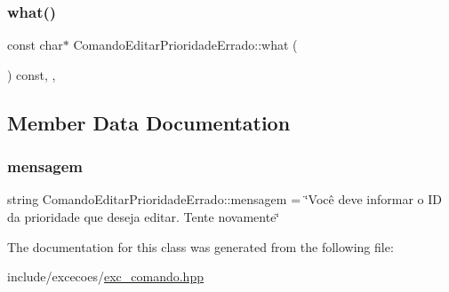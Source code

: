 \subsubsection{\texorpdfstring{what()}{what()}}
{\footnotesize\ttfamily const char$\ast$ Comando\+Editar\+Prioridade\+Errado\+::what (\begin{DoxyParamCaption}{ }\end{DoxyParamCaption}) const\hspace{0.3cm}{\ttfamily [inline]}, {\ttfamily [override]}, {\ttfamily [noexcept]}}



\subsection{Member Data Documentation}
\mbox{\label{classComandoEditarPrioridadeErrado_a262cdc745b1bfc1d621b657a3c7c39ed}} 
\subsubsection{\texorpdfstring{mensagem}{mensagem}}
{\footnotesize\ttfamily string Comando\+Editar\+Prioridade\+Errado\+::mensagem = \char`\"{}Você deve informar o ID da prioridade que deseja editar. Tente novamente\char`\"{}\hspace{0.3cm}{\ttfamily [private]}}



The documentation for this class was generated from the following file\+:\begin{DoxyCompactItemize}
\item 
include/excecoes/\hyperlink{exc__comando_8hpp}{exc\+\_\+comando.\+hpp}\end{DoxyCompactItemize}
